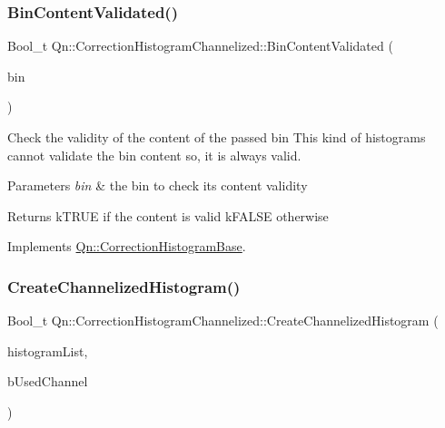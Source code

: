 \subsubsection{\texorpdfstring{Bin\+Content\+Validated()}{BinContentValidated()}}
{\footnotesize\ttfamily Bool\+\_\+t Qn\+::\+Correction\+Histogram\+Channelized\+::\+Bin\+Content\+Validated (\begin{DoxyParamCaption}\item[{Long64\+\_\+t}]{bin }\end{DoxyParamCaption})\hspace{0.3cm}{\ttfamily [virtual]}}

Check the validity of the content of the passed bin This kind of histograms cannot validate the bin content so, it is always valid. 
\begin{DoxyParams}{Parameters}
{\em bin} & the bin to check its content validity \\
\hline
\end{DoxyParams}
\begin{DoxyReturn}{Returns}
k\+T\+R\+UE if the content is valid k\+F\+A\+L\+SE otherwise 
\end{DoxyReturn}


Implements \mbox{\hyperlink{classQn_1_1CorrectionHistogramBase_a4db2c92ceaffefaa91475a721612d80d}{Qn\+::\+Correction\+Histogram\+Base}}.

\mbox{\label{classQn_1_1CorrectionHistogramChannelized_a3dba90ec0d5dc2a4e346d52ed980f404}} 
\subsubsection{\texorpdfstring{Create\+Channelized\+Histogram()}{CreateChannelizedHistogram()}}
{\footnotesize\ttfamily Bool\+\_\+t Qn\+::\+Correction\+Histogram\+Channelized\+::\+Create\+Channelized\+Histogram (\begin{DoxyParamCaption}\item[{T\+List $\ast$}]{histogram\+List,  }\item[{const Bool\+\_\+t $\ast$}]{b\+Used\+Channel }\end{DoxyParamCaption})}

